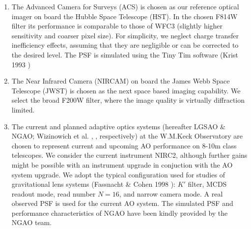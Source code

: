 \documentclass[a4paper,11pt]{article}
\begin{document}
\begin{enumerate}

\item  The Advanced Camera for Surveys (ACS) is chosen as our reference optical imager on board the Hubble Space Telescope (HST). In the chosen F814W filter its performance is comparable to those of WFC3 (slightly higher sensitivity and coarser pixel size). For simplicity, we neglect charge transfer inefficiency effects, assuming that they are negligible or can be corrected to the desired level. The PSF is simulated using the Tiny Tim software (Krist 1993 \cite{1993ASPC...52..536K})

\item The Near Infrared Camera (NIRCAM) on board the James Webb Space Telescope (JWST) is chosen as the next space based imaging capability. We select the broad F200W filter, where the image quality is virtually diffraction limited.


\item The current and planned adaptive optics systems (hereafter LGSAO \& NGAO; Wizinowich et al. \citep{2006PASP..118..297W}, \citep{2010SPIE.7736E..0KW}, respectively) at the W.M.Keck Observatory are chosen to represent current and upcoming AO performance on 8-10m class telescopes. We consider the current instrument NIRC2, although further gains might be possible with an instrument upgrade in conjuction with the AO system upgrade. We adopt the typical configuration used for studies of gravitational lens systems (Fassnacht \& Cohen 1998 \citep{1998AJ....115..377F}): $K'$ filter, MCDS readout mode, read number $N=16$, and narrow camera mode. A real observed PSF is used for the current AO system. The simulated PSF and performance characteristics of NGAO have been kindly provided by the NGAO team.


\end{enumerate}
\end{document}
